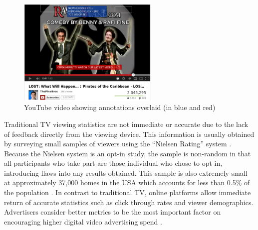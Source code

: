 	\begin{figure}[htb]
		\centering
			\includegraphics[width=0.6\textwidth]{images/youtube_annotations.png}
		\caption{YouTube video showing annotations overlaid (in blue and red)}
		\label{fig:youtube_annotation}
	\end{figure}

	Traditional TV viewing statistics are not immediate or accurate due to the lack of feedback directly from the viewing device. This information is usually obtained by surveying small samples of viewers using the ``Nielsen Rating'' system \citep{nielsen-sample}. Because the Nielsen system is an opt-in study, the sample is non-random in that all participants who take part are those individual who chose to opt in, introducing flaws into any results obtained. This sample is also extremely small at approximately 37,000 homes in the USA which accounts for less than 0.5\% of the population \citep{nielsen-sample}. In contrast to traditional TV, online platforms allow immediate return of accurate statistics such as click through rates and viewer demographics. Advertisers consider better metrics to be the most important factor on encouraging higher digital video advertising spend \citep{brightroll-report}.



